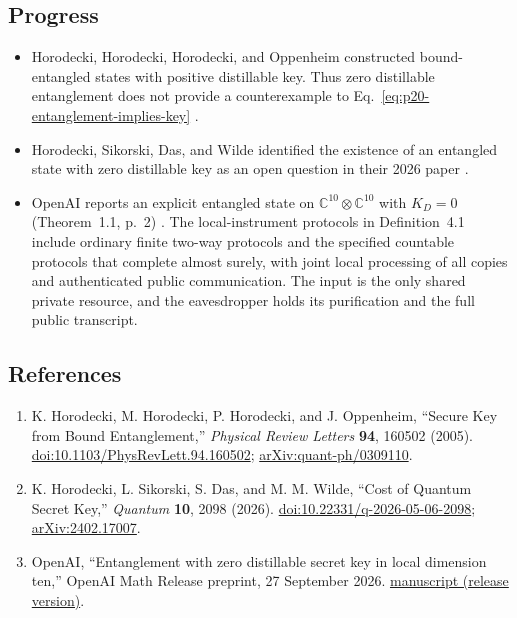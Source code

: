 \subsection*{Progress}

\begin{itemize}
  \item Horodecki, Horodecki, Horodecki, and Oppenheim constructed
  bound-entangled states with positive distillable key.  Thus zero
  distillable entanglement does not provide a counterexample to
  Eq.~\eqref{eq:p20-entanglement-implies-key}
  .

  \item Horodecki, Sikorski, Das, and Wilde identified the existence of an
  entangled state with zero distillable key as an open question in their
  2026 paper .

  \item OpenAI reports an explicit entangled state on
  $\mathbb C^{10}\otimes\mathbb C^{10}$ with $K_D=0$
  (Theorem~1.1, p.~2) .
  The local-instrument protocols in Definition~4.1 include ordinary finite two-way
  protocols and the specified countable protocols that complete almost
  surely, with joint local
  processing of all copies and authenticated public communication. The
  input is the only shared private resource, and the eavesdropper holds
  its purification and the full public transcript.
\end{itemize}

\subsection*{References}

\begin{enumerate}[label={},leftmargin=4.8em,labelsep=0.5em]
  \footnotesize
  \item[\textup{[HHHO05]}]\label{ref:p20-bound-key}
  K. Horodecki, M. Horodecki, P. Horodecki, and J. Oppenheim,
  ``Secure Key from Bound Entanglement,''
  \emph{Physical Review Letters} \textbf{94}, 160502 (2005).
  \href{https://doi.org/10.1103/PhysRevLett.94.160502}{doi:10.1103/PhysRevLett.94.160502};
  \href{https://arxiv.org/abs/quant-ph/0309110}{arXiv:quant-ph/0309110}.

  \item[\textup{[HSDW26]}]\label{ref:p20-key-cost}
  K. Horodecki, L. Sikorski, S. Das, and M. M. Wilde,
  ``Cost of Quantum Secret Key,'' \emph{Quantum} \textbf{10}, 2098 (2026).
  \href{https://doi.org/10.22331/q-2026-05-06-2098}{doi:10.22331/q-2026-05-06-2098};
  \href{https://arxiv.org/abs/2402.17007}{arXiv:2402.17007}.

  \item[\textup{[OAI26]}]\label{ref:p20-openai-zero-key}
  OpenAI, ``Entanglement with zero distillable secret key in local dimension ten,'' OpenAI Math Release preprint, 27 September 2026.
\href{https://github.com/openai/math/blob/adc7f1241b42e322a6451854ab7e4b4c146bf78a/preprints/Entanglement-with-zero-distillable-secret-key-in-local-dimension-ten-September-27-2026/paper.pdf}{manuscript (release version)}.
\end{enumerate}

